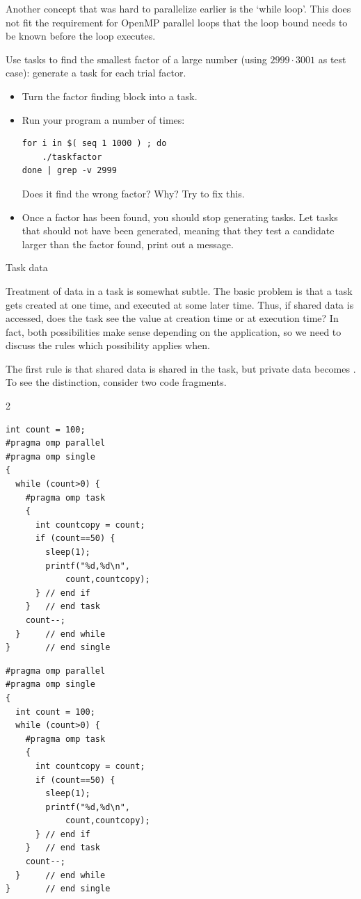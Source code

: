 Another concept that was hard to parallelize earlier is the `while
loop'. This does not fit the requirement for OpenMP parallel loops
that the loop bound needs to be known before the loop executes.

\begin{exercise}
  \label{ex:taskfactor}
  Use tasks to find the smallest factor of a large
  number (using $2999\cdot 3001$ as test case): generate a task for each
  trial factor.
  \begin{itemize}
  \item Turn the factor finding block into a task.
  \item Run your program a number of times:
\begin{lstlisting}[language=shell]
for i in $( seq 1 1000 ) ; do
    ./taskfactor
done | grep -v 2999
\end{lstlisting}
    Does it find the wrong factor? Why? Try to fix this.
\item Once a factor has been found, you should stop generating
    tasks.
    Let tasks that should not have been generated, meaning that they
    test a candidate larger than the factor found, print out a message.
  \end{itemize}
\end{exercise}


 {Task data}

Treatment of data in a task is somewhat subtle. The basic problem is
that a task gets created at one time, and executed at some later time.
Thus,
if shared data is accessed, does the task see the value at creation
time or at execution time? In fact, both possibilities make sense
depending on the application, so we need to discuss the rules 
which possibility applies when.

The first rule is that shared data is shared in the task, but private
data becomes . To see the distinction, consider two
code fragments.

\begin{multicols}{2}
\begin{lstlisting}[language=omp]
int count = 100;
#pragma omp parallel
#pragma omp single
{
  while (count>0) {
    #pragma omp task
    {
      int countcopy = count;
      if (count==50) {
        sleep(1);
        printf("%d,%d\n",
            count,countcopy);
      } // end if
    }   // end task
    count--;
  }     // end while
}       // end single
\end{lstlisting}

\columnbreak

\begin{lstlisting}[language=omp]
#pragma omp parallel
#pragma omp single
{
  int count = 100;
  while (count>0) {
    #pragma omp task
    {
      int countcopy = count;
      if (count==50) {
        sleep(1);
        printf("%d,%d\n",
            count,countcopy);
      } // end if
    }   // end task
    count--;
  }     // end while
}       // end single
\end{lstlisting}

\end{multicols}

